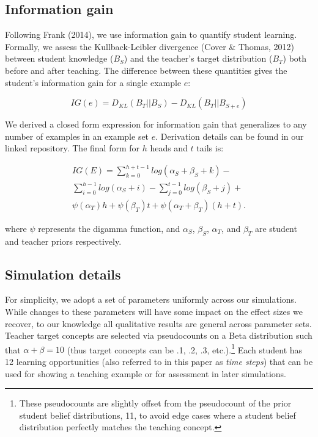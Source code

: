 \documentclass[10pt, letterpaper]{article}
\begin{document}
\subsection{Information gain}\label{information-gain}

Following Frank (2014), we use information gain to quantify student
learning. Formally, we assess the Kullback-Leibler divergence (Cover \&
Thomas, 2012) between student knowledge (\(B_S\)) and the teacher's
target distribution (\(B_T\)) both before and after teaching. The
difference between these quantities gives the student's information gain
for a single example \(e\):

\[IG(e) = D_{KL}(B_T ||B_S) - D_{KL}(B_T || B_{S+e})\]

We derived a closed form expression for information gain that
generalizes to any number of examples in an example set \(e\).
Derivation details can be found in our linked repository. The final form
for \(h\) heads and \(t\) tails is:

\begin{multline}
IG(E) = \sum_{k=0}^{h+t-1} {log(\alpha_S + \beta_S + k)} - \\
\sum_{i=0}^{h-1} {log (\alpha_S + i)} - \sum_{j=0}^{t-1} {log(\beta_S +j)} + \\
\psi(\alpha_T)h + \psi(\beta_T)t +  \psi(\alpha_T + \beta_T)(h+t).
\end{multline}

\noindent where \(\psi\) represents the digamma function, and
\(\alpha_S\), \(\beta_S\), \(\alpha_T\), and \(\beta_T\) are student and
teacher priors respectively.

\subsection{Simulation details}\label{simulation-details}

For simplicity, we adopt a set of parameters uniformly across our
simulations. While changes to these parameters will have some impact on
the effect sizes we recover, to our knowledge all qualitative results
are general across parameter sets. Teacher target concepts are selected
via pseudocounts on a Beta distribution such that
\(\alpha + \beta = 10\) (thus target concepts can be .1, .2, .3,
etc.).\footnote{These pseudocounts are slightly offset from the pseudocount of the prior student belief distributions, 11, to avoid edge cases where a student belief distribution perfectly matches the teaching concept.}
Each student has 12 learning opportunities (also referred to in this
paper as \emph{time steps}) that can be used for showing a teaching
example or for assessment in later simulations.
\end{document}
